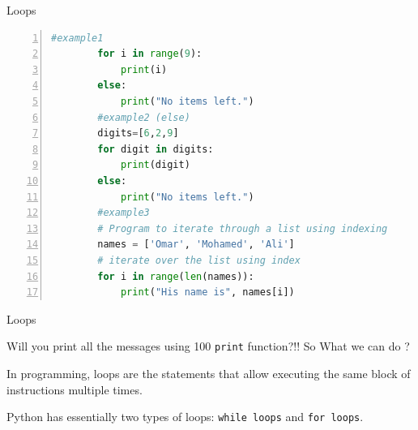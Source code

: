 \begin{frame}[fragile]{Loops}
    \begin{lstlisting}[numbers=left,showstringspaces=false,language=python]
        #example1
        for i in range(9):
            print(i)
        else:
            print("No items left.")
        #example2 (else)
        digits=[6,2,9]
        for digit in digits:
            print(digit)
        else:
            print("No items left.")
        #example3
        # Program to iterate through a list using indexing
        names = ['Omar', 'Mohamed', 'Ali']
        # iterate over the list using index
        for i in range(len(names)):
            print("His name is", names[i])
    \end{lstlisting}
\end{frame}
\begin{frame}[fragile]{Loops}
   \pause

    Will you print all the messages using 100 \texttt{print} function?!! So What we can do ?
\pause    
    \begin{block}{}
        In programming, loops are the statements that allow executing the same block of instructions multiple times.


        Python has essentially two types of loops: \texttt{while loops} and \texttt{for loops}.
    \end{block}
\end{frame}
